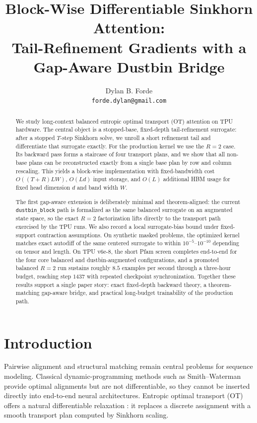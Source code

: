 \documentclass{article}
\title{Block-Wise Differentiable Sinkhorn Attention:\\Tail-Refinement Gradients with a Gap-Aware Dustbin Bridge}
\author{
Dylan B. Forde \\
\texttt{forde.dylan@gmail.com}
}
\date{}
\begin{document}
\maketitle

\begin{abstract}
We study long-context balanced entropic optimal transport (OT) attention on TPU hardware. The central object is a stopped-base, fixed-depth tail-refinement surrogate: after a stopped $T$-step Sinkhorn solve, we unroll a short refinement tail and differentiate that surrogate exactly. For the production kernel we use the $R=2$ case. Its backward pass forms a staircase of four transport plans, and we show that all non-base plans can be reconstructed exactly from a single base plan by row and column rescaling. This yields a block-wise implementation with fixed-bandwidth cost $O((T+R)LW)$, $O(Ld)$ input storage, and $O(L)$ additional HBM usage for fixed head dimension $d$ and band width $W$.

The first gap-aware extension is deliberately minimal and theorem-aligned: the current \texttt{dustbin\_block} path is formalized as the same balanced surrogate on an augmented state space, so the exact $R=2$ factorization lifts directly to the transport path exercised by the TPU runs. We also record a local surrogate-bias bound under fixed-support contraction assumptions. On synthetic masked problems, the optimized kernel matches exact autodiff of the same centered surrogate to within $10^{-5}$--$10^{-10}$ depending on tensor and length. On TPU v6e-8, the short Pfam screen completes end-to-end for the four core balanced and dustbin-augmented configurations, and a promoted balanced $R=2$ run sustains roughly $8.5$ examples per second through a three-hour budget, reaching step $1437$ with repeated checkpoint synchronization. Together these results support a single paper story: exact fixed-depth backward theory, a theorem-matching gap-aware bridge, and practical long-budget trainability of the production path.
\end{abstract}

\section{Introduction}

Pairwise alignment and structural matching remain central problems for sequence modeling. Classical dynamic-programming methods such as Smith--Waterman \citep{smith1981identification} provide optimal alignments but are not differentiable, so they cannot be inserted directly into end-to-end neural architectures. Entropic optimal transport (OT) offers a natural differentiable relaxation \citep{cuturi2013sinkhorn, peyre2019computational}: it replaces a discrete assignment with a smooth transport plan computed by Sinkhorn scaling.
\end{document}
